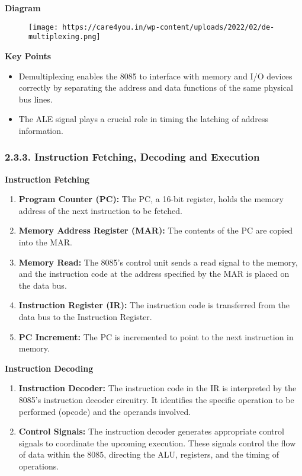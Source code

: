 \documentclass[
]{article}
\begin{document}
\textbf{Diagram}

\begin{figure}
\centering
\texttt{[image: https://care4you.in/wp-content/uploads/2022/02/de-multiplexing.png]}
\caption{}
\end{figure}

\textbf{Key Points}

\begin{itemize}
\item
  Demultiplexing enables the 8085 to interface with memory and I/O
  devices correctly by separating the address and data functions of the
  same physical bus lines.
\item
  The ALE signal plays a crucial role in timing the latching of address
  information.
\end{itemize}

\hypertarget{233-instruction-fetching-decoding-and-execution}{%
\subsubsection{2.3.3. Instruction Fetching, Decoding and
Execution}\label{233-instruction-fetching-decoding-and-execution}}

\textbf{Instruction Fetching}

\begin{enumerate}
\def\labelenumi{\arabic{enumi}.}
\item
  \textbf{Program Counter (PC):} The PC, a 16-bit register, holds the
  memory address of the next instruction to be fetched.
\item
  \textbf{Memory Address Register (MAR):} The contents of the PC are
  copied into the MAR.
\item
  \textbf{Memory Read:} The 8085's control unit sends a read signal to
  the memory, and the instruction code at the address specified by the
  MAR is placed on the data bus.
\item
  \textbf{Instruction Register (IR):} The instruction code is
  transferred from the data bus to the Instruction Register.
\item
  \textbf{PC Increment:} The PC is incremented to point to the next
  instruction in memory.
\end{enumerate}

\textbf{Instruction Decoding}

\begin{enumerate}
\def\labelenumi{\arabic{enumi}.}
\item
  \textbf{Instruction Decoder:} The instruction code in the IR is
  interpreted by the 8085's instruction decoder circuitry. It identifies
  the specific operation to be performed (opcode) and the operands
  involved.
\item
  \textbf{Control Signals:} The instruction decoder generates
  appropriate control signals to coordinate the upcoming execution.
  These signals control the flow of data within the 8085, directing the
  ALU, registers, and the timing of operations.
\end{enumerate}
\end{document}
